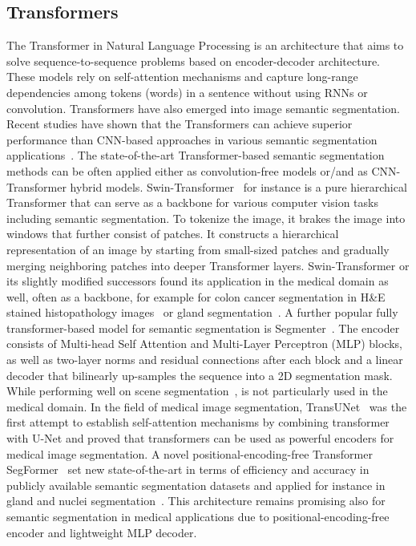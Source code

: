 \subsection{Transformers}
The Transformer in  Natural Language Processing is an architecture that aims to solve sequence-to-sequence problems based on encoder-decoder architecture. These models rely on self-attention mechanisms and capture long-range dependencies among tokens (words) in a sentence without using RNNs or convolution. Transformers have also emerged into image semantic segmentation. Recent studies have shown that the Transformers can achieve superior performance than CNN-based approaches in various semantic segmentation applications~\cite{nguyen2022evaluating}. The state-of-the-art Transformer-based semantic segmentation methods can be often applied either as convolution-free models or/and as CNN-Transformer hybrid models. Swin-Transformer~\cite{liu2021swin} for instance is a pure hierarchical Transformer that can serve as a  backbone for various computer vision tasks including semantic segmentation. To tokenize the image, it brakes the image into windows that further consist of patches. It constructs a hierarchical representation of an image by starting from small-sized patches and gradually merging neighboring patches into deeper Transformer layers. Swin-Transformer or its slightly modified successors found its application in the medical domain as well, often as a backbone, for example for colon cancer segmentation in H\&E stained histopathology images~\cite{qian2022transformer} or gland segmentation~\cite{lin2022ds}. A further popular fully transformer-based model for semantic segmentation is Segmenter~\cite{strudel2021segmenter}. The encoder consists of Multi-head Self Attention and Multi-Layer Perceptron (MLP) blocks, as well as two-layer norms and residual connections after each block and a linear decoder that bilinearly up-samples the sequence into a 2D segmentation mask. While performing well on scene segmentation~\cite{strudel2021segmenter}, is not particularly used in the medical domain. In the field of medical image segmentation, TransUNet~\cite{chen2021transunet} was the first attempt to establish self-attention mechanisms by combining transformer with U-Net and proved that transformers can be used as powerful encoders for medical image segmentation. A novel positional-encoding-free Transformer SegFormer~\cite{https://doi.org/10.48550/arxiv.2105.15203} set new state-of-the-art in terms of efficiency and accuracy in publicly available semantic segmentation datasets and applied for instance in gland and nuclei segmentation~\cite{lin2022ds}. This architecture remains promising also for semantic segmentation in medical applications due to positional-encoding-free encoder and lightweight MLP decoder.

